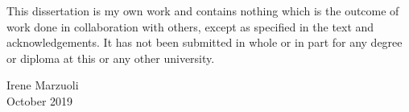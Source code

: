 \begin{onehalfspacing}
\vspace{.2cm}

\noindent This dissertation is my own work and contains nothing which is the outcome of work done in collaboration with others, except as specified in the text and acknowledgements.
%
It has not been submitted in whole or in part for any degree or diploma at this or any other university.

\vspace{1.5cm}

\begin{raggedleft}
Irene Marzuoli \\
October 2019

\end{raggedleft}
\end{onehalfspacing}


%
%

\thispagestyle{empty}
